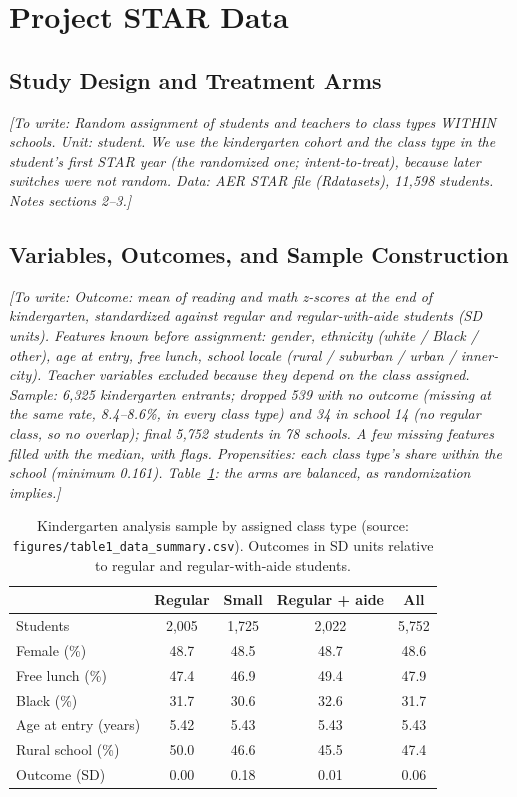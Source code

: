 \documentclass[11pt]{article}
\newcommand{\placeholder}[1]{\par\noindent\textit{[To write: #1]}\par}
\begin{document}
\section{Project STAR Data}  %

\subsection{Study Design and Treatment Arms}
\placeholder{Random assignment of students and teachers to class types WITHIN schools.
Unit: student. We use the kindergarten cohort and the class type in the student's first
STAR year (the randomized one; intent-to-treat), because later switches were not random.
Data: AER STAR file (Rdatasets), 11,598 students. Notes sections 2--3.}

\subsection{Variables, Outcomes, and Sample Construction}
\placeholder{Outcome: mean of reading and math z-scores at the end of kindergarten,
standardized against regular and regular-with-aide students (SD units). Features known
before assignment: gender, ethnicity (white / Black / other), age at entry, free lunch,
school locale (rural / suburban / urban / inner-city). Teacher variables excluded because
they depend on the class assigned. Sample: 6,325 kindergarten entrants; dropped 539 with no
outcome (missing at the same rate, 8.4--8.6\%, in every class type) and 34 in school 14
(no regular class, so no overlap); final 5,752 students in 78 schools. A few missing
features filled with the median, with flags. Propensities: each class type's share within
the school (minimum 0.161). Table~\ref{tab:descriptives}: the arms are balanced, as
randomization implies.}

\begin{table}[htbp]
\centering
\caption{Kindergarten analysis sample by assigned class type (source:
\texttt{figures/table1\_data\_summary.csv}). Outcomes in SD units relative to regular
and regular-with-aide students.}
\label{tab:descriptives}
\begin{tabular}{lcccc}
\toprule
 & Regular & Small & Regular + aide & All \\
\midrule
Students        & 2{,}005 & 1{,}725 & 2{,}022 & 5{,}752 \\
Female (\%)     & 48.7 & 48.5 & 48.7 & 48.6 \\
Free lunch (\%) & 47.4 & 46.9 & 49.4 & 47.9 \\
Black (\%)      & 31.7 & 30.6 & 32.6 & 31.7 \\
Age at entry (years) & 5.42 & 5.43 & 5.43 & 5.43 \\
Rural school (\%) & 50.0 & 46.6 & 45.5 & 47.4 \\
Outcome (SD)    & 0.00 & 0.18 & 0.01 & 0.06 \\
\bottomrule
\end{tabular}
\end{table}
\end{document}
